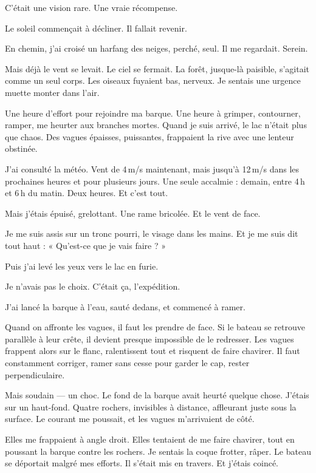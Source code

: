 C’était une vision rare. Une vraie récompense.

Le soleil commençait à décliner. Il fallait revenir.

En chemin, j’ai croisé un harfang des neiges, perché, seul. Il me regardait. Serein.





Mais déjà le vent se levait. Le ciel se fermait. La forêt, jusque-là paisible, s’agitait comme un seul corps. Les oiseaux fuyaient bas, nerveux. Je sentais une urgence muette monter dans l’air.

Une heure d’effort pour rejoindre ma barque. Une heure à grimper, contourner, ramper, me heurter aux branches mortes. Quand je suis arrivé, le lac n’était plus que chaos. Des vagues épaisses, puissantes, frappaient la rive avec une lenteur obstinée.

J’ai consulté la météo. Vent de 4 m/s maintenant, mais jusqu’à 12 m/s dans les prochaines heures et pour plusieurs jours. Une seule accalmie : demain, entre 4 h et 6 h du matin. Deux heures. Et c’est tout.

Mais j’étais épuisé, grelottant. Une rame bricolée. Et le vent de face.

Je me suis assis sur un tronc pourri, le visage dans les mains. Et je me suis dit tout haut : « Qu’est-ce que je vais faire ? »

Puis j’ai levé les yeux vers le lac en furie.

Je n’avais pas le choix. C’était ça, l’expédition.

J’ai lancé la barque à l’eau, sauté dedans, et commencé à ramer.

Quand on affronte les vagues, il faut les prendre de face. Si le bateau se retrouve parallèle à leur crête, il devient presque impossible de le redresser. Les vagues frappent alors sur le flanc, ralentissent tout et risquent de faire chavirer. Il faut constamment corriger, ramer sans cesse pour garder le cap, rester perpendiculaire.

Mais soudain — un choc. Le fond de la barque avait heurté quelque chose. J’étais sur un haut-fond. Quatre rochers, invisibles à distance, affleurant juste sous la surface. Le courant me poussait, et les vagues m’arrivaient de côté.

Elles me frappaient à angle droit. Elles tentaient de me faire chavirer, tout en poussant la barque contre les rochers. Je sentais la coque frotter, râper. Le bateau se déportait malgré mes efforts. Il s’était mis en travers. Et j’étais coincé.

